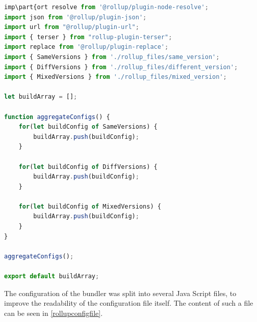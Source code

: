 \begin{lstlisting}[language=JavaScript, caption=Content of the \texttt{rollup.config.js}, label=rollupconfigjs]
imp\part{ort resolve from '@rollup/plugin-node-resolve';
import json from '@rollup/plugin-json';
import url from "@rollup/plugin-url";
import { terser } from "rollup-plugin-terser";
import replace from '@rollup/plugin-replace';
import { SameVersions } from './rollup_files/same_version';
import { DiffVersions } from './rollup_files/different_version';
import { MixedVersions } from './rollup_files/mixed_version';

let buildArray = [];

function aggregateConfigs() {
	for(let buildConfig of SameVersions) {
		buildArray.push(buildConfig);
	}
	
	for(let buildConfig of DiffVersions) {
		buildArray.push(buildConfig);
	}
	
	for(let buildConfig of MixedVersions) {
		buildArray.push(buildConfig);
	}
}

aggregateConfigs();

export default buildArray;
\end{lstlisting}

The configuration of the bundler was split into several Java Script files, to improve the readability of the configuration file itself. The content of such a file can be seen in \ref{rollupconfigfile}.

